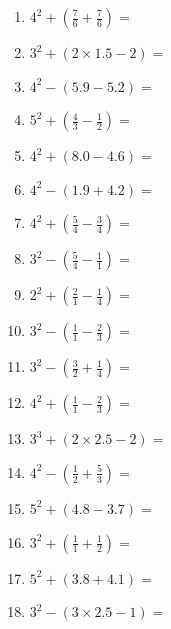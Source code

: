 \documentclass[12pt]{article}
\begin{document}
    \begin{enumerate}
\item \large $ 4^{2} + (\frac{7}{6} + \frac{7}{6}) = $ \vspace{1.4cm}
\item \large $ 3^{2} + (2 \times 1.5 - 2) = $ \vspace{1.4cm}
\item \large $ 4^{2} - (5.9 - 5.2) = $ \vspace{1.4cm}
\item \large $ 5^{2} + (\frac{4}{3} - \frac{1}{2}) = $ \vspace{1.4cm}
\item \large $ 4^{2} + (8.0 - 4.6) = $ \vspace{1.4cm}
\item \large $ 4^{2} - (1.9 + 4.2) = $ \vspace{1.4cm}
\item \large $ 4^{2} + (\frac{5}{4} - \frac{3}{4}) = $ \vspace{1.4cm}
\item \large $ 3^{2} - (\frac{5}{4} - \frac{1}{1}) = $ \vspace{1.4cm}
\newpage
\item \large $ 2^{2} + (\frac{2}{1} - \frac{1}{4}) = $ \vspace{1.4cm}
\item \large $ 3^{2} - (\frac{1}{1} - \frac{2}{3}) = $ \vspace{1.4cm}
\item \large $ 3^{2} - (\frac{3}{2} + \frac{1}{4}) = $ \vspace{1.4cm}
\item \large $ 4^{2} + (\frac{1}{1} - \frac{2}{3}) = $ \vspace{1.4cm}
\item \large $ 3^{3} + (2 \times 2.5 - 2) = $ \vspace{1.4cm}
\item \large $ 4^{2} - (\frac{1}{2} + \frac{5}{3}) = $ \vspace{1.4cm}
\item \large $ 5^{2} + (4.8 - 3.7) = $ \vspace{1.4cm}
\item \large $ 3^{2} + (\frac{1}{1} + \frac{1}{2}) = $ \vspace{1.4cm}
\item \large $ 5^{2} + (3.8 + 4.1) = $ \vspace{1.4cm}
\item \large $ 3^{2} - (3 \times 2.5 - 1) = $ \vspace{1.4cm}

\end{enumerate}
\end{document}
